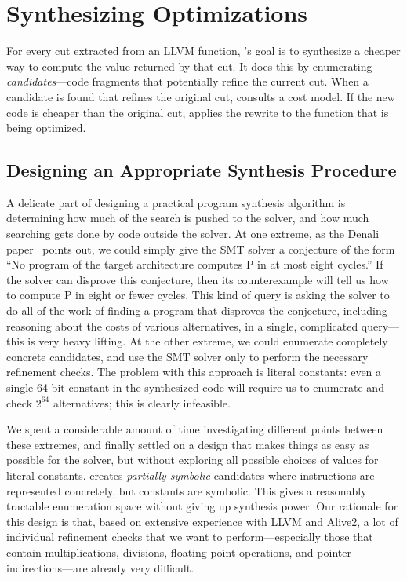 \section{Synthesizing Optimizations}

For every cut extracted from an LLVM function, \minotaur{}'s goal is to
synthesize a cheaper way to compute the value returned by that cut.
%
It does this by enumerating \emph{candidates}---code fragments that
potentially refine the current cut.
%
When a candidate is found that refines the original cut, \minotaur{}
consults a cost model.
%
If the new code is cheaper than the original cut, \minotaur{} applies the
rewrite to the function that is being optimized.

\subsection{Designing an Appropriate Synthesis Procedure}

A delicate part of designing a practical program synthesis algorithm
is determining how much of the search is pushed to the solver, and how
much searching gets done by code outside the solver.
%
At one extreme, as the Denali paper~\cite{denali02} points out, we
could simply give the SMT solver a conjecture of the form ``No program
of the target architecture computes P in at most eight cycles.''
%
If the solver can disprove this conjecture, then its counterexample
will tell us how to compute P in eight or fewer cycles.
%
This kind of query is asking the solver to do all of the work of
finding a program that disproves the conjecture, including reasoning
about the costs of various alternatives, in a single, complicated
query---this is very heavy lifting.
%
At the other extreme, we could enumerate completely concrete
candidates, and use the SMT solver only to perform the necessary
refinement checks.
%
The problem with this approach is literal constants: even a single
64-bit constant in the synthesized code will require us to enumerate
and check $2^{64}$ alternatives; this is clearly infeasible.


We spent a considerable amount of time investigating different points
between these extremes, and finally settled on a design that makes
things as easy as possible for the solver, but without exploring all
possible choices of values for literal constants.
%
\minotaur{} creates \emph{partially symbolic} candidates where
instructions are represented concretely, but constants are symbolic.
%
This gives a reasonably tractable enumeration space without giving up
synthesis power.
%
Our rationale for this design is that, based on extensive experience
with LLVM and Alive2, a lot of individual refinement checks that we
want to perform---especially those that contain multiplications,
divisions, floating point operations, and pointer indirections---are
already very difficult.


